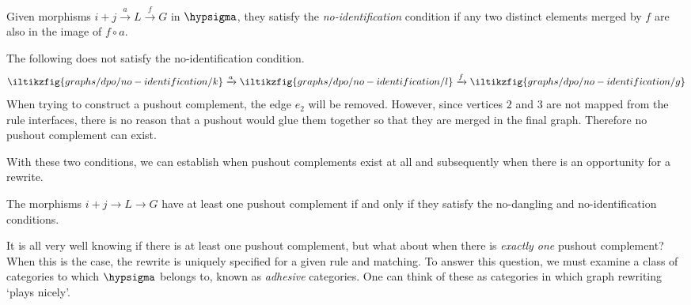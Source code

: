 \begin{definition}
    Given morphisms \(i+j \xrightarrow{a} L \xrightarrow{f} G\) in
    \(\hypsigma\), they satisfy the \emph{no-identification} condition if any
    two distinct elements merged by \(f\) are also in the image of \(f \circ a\).
\end{definition}

\begin{example}
    The following does not satisfy the no-identification
    condition.
    \[
        \iltikzfig{graphs/dpo/no-identification/k}
        \xrightarrow{a}
        \iltikzfig{graphs/dpo/no-identification/l}
        \xrightarrow{f}
        \iltikzfig{graphs/dpo/no-identification/g}
    \]
    When trying to construct a pushout complement, the edge \(e_2\) will be
    removed.
    However, since vertices \(2\) and \(3\) are not mapped from the rule
    interfaces, there is no reason that a pushout would glue them together so
    that they are merged in the final graph.
    Therefore no pushout complement can exist.
    \begin{center}
    \end{center}
\end{example}

With these two conditions, we can establish when pushout complements exist at
all and subsequently when there is an opportunity for a rewrite.

\begin{proposition}
    \label{prop:pushout-complement}
    The morphisms \(i+j \to L \to G\) have at least one pushout
    complement if and only if they satisfy the no-dangling and no-identification
    conditions.
\end{proposition}

It is all very well knowing if there is at least one pushout complement, but
what about when there is \emph{exactly one} pushout complement?
When this is the case, the rewrite is uniquely specified for a given rule and
matching.
To answer this question, we must examine a class of categories to which
\(\hypsigma\) belongs to, known as \emph{adhesive} categories.
One can think of these as categories in which graph rewriting `plays nicely'.

